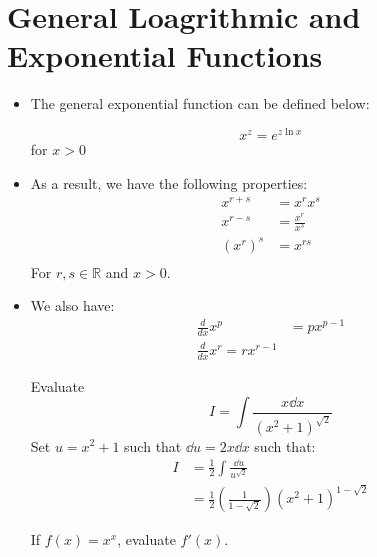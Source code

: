 \section{General Loagrithmic and Exponential Functions}
\begin{itemize}
    \item The general exponential function can be defined below:
    \begin{definition}
        \begin{equation}
            x^{z} = e^{z\ln x}
            \label{eq:}
        \end{equation}
        for $x>0$
    \end{definition}
    \item As a result, we have the following properties:
    \begin{align}
        x^{r+s} &= x^rx^s \\ 
        x^{r-s} &= \frac{x^r}{x^s} \\ 
        (x^r)^s &= x^{rs} \\ 
        \label{eq:}
    \end{align}
    For $r,s \in \mathbb{R}$ and $x>0$.
    \item We also have:
    \begin{align}
        \frac{d}{dx}x^p &= px^{p-1} \\ 
        \frac{d}{dx}x^r = rx^{r-1}
    \end{align}
    \begin{example}
        Evaluate
        \begin{equation}
            I = \int \frac{x \dd{x}}{(x^2+1)^{\sqrt{2}}}
            \label{eq:}
        \end{equation}
        Set $u=x^2+1$ such that $\dd{u}=2x\dd{x}$ such that:
        \begin{align}
            I &= \frac{1}{2} \int \frac{\dd{u}}{u^{\sqrt{2}}} \\ 
            &= \frac{1}{2}\left(\frac{1}{1-\sqrt{2}}\right)(x^2+1)^{1-\sqrt{2}}
        \end{align}
    \end{example}
    \begin{example}
        If $f(x)=x^x$, evaluate $f'(x)$.
        \vspace{2mm}


\end{example}
\end{itemize}
